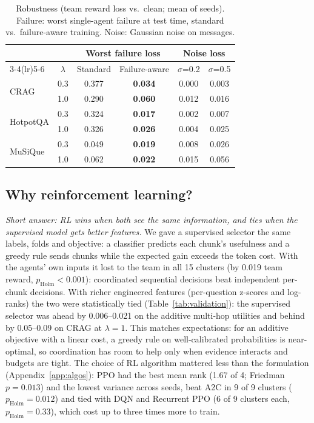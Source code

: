 \documentclass[sigconf,anonymous]{aamas}
\theoremstyle{plain}
\theoremstyle{definition}
\begin{document}
\begin{table}[t]
\centering\small
\caption{Robustness (team reward loss vs.\ clean; mean of seeds). Failure: worst single-agent failure at test time, standard vs.\ failure-aware training. Noise: Gaussian noise on messages.}
\label{tab:robust}
\setlength{\tabcolsep}{3pt}
\begin{tabular}{l c cc cc}
\toprule
 & & \multicolumn{2}{c}{Worst failure loss} & \multicolumn{2}{c}{Noise loss} \\
\cmidrule(lr){3-4}\cmidrule(lr){5-6}
 & $\lambda$ & Standard & Failure-aware & $\sigma$=0.2 & $\sigma$=0.5 \\
\midrule
\multirow{2}{*}{CRAG} & 0.3 & 0.377 & \textbf{0.034} & 0.000 & 0.003 \\
 & 1.0 & 0.290 & \textbf{0.060} & 0.012 & 0.016 \\
\multirow{2}{*}{HotpotQA} & 0.3 & 0.324 & \textbf{0.017} & 0.002 & 0.007 \\
 & 1.0 & 0.326 & \textbf{0.026} & 0.004 & 0.025 \\
\multirow{2}{*}{MuSiQue} & 0.3 & 0.049 & \textbf{0.019} & 0.008 & 0.026 \\
 & 1.0 & 0.062 & \textbf{0.022} & 0.015 & 0.056 \\
\bottomrule
\end{tabular}
\end{table}

\subsection{Why reinforcement learning?}

\emph{Short answer: RL wins when both see the same information, and ties when the supervised model gets better features.} We gave a supervised selector the same labels, folds and objective: a classifier predicts each chunk's usefulness and a greedy rule sends chunks while the expected gain exceeds the token cost. With the agents' own inputs it lost to the team in all 15 clusters (by 0.019 team reward, $p_{\mathrm{Holm}}<0.001$): coordinated sequential decisions beat independent per-chunk decisions. With richer engineered features (per-question z-scores and log-ranks) the two were statistically tied (Table~\ref{tab:validation}): the supervised selector was ahead by 0.006--0.021 on the additive multi-hop utilities and behind by 0.05--0.09 on CRAG at $\lambda=1$. This matches expectations: for an additive objective with a linear cost, a greedy rule on well-calibrated probabilities is near-optimal, so coordination has room to help only when evidence interacts and budgets are tight. The choice of RL algorithm mattered less than the formulation (Appendix~\ref{app:algos}): PPO had the best mean rank (1.67 of 4; Friedman $p=0.013$) and the lowest variance across seeds, beat A2C in 9 of 9 clusters ($p_{\mathrm{Holm}}=0.012$) and tied with DQN and Recurrent PPO (6 of 9 clusters each, $p_{\mathrm{Holm}}=0.33$), which cost up to three times more to train.
\end{document}
